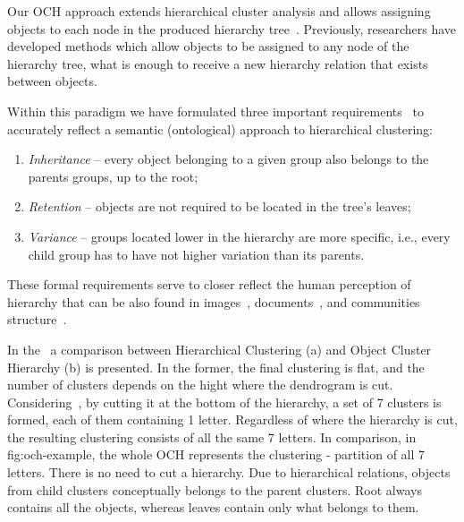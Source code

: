 \documentclass{article}
\begin{document}

    
Our OCH approach extends hierarchical cluster analysis and allows assigning objects to each node in the produced hierarchy tree~\cite{ghahramani2010tree,Spytkowski2012,Olech2016,2010_bayesian_rose_trees}. Previously, researchers have developed methods which allow objects to be assigned to any node of the hierarchy tree, what is enough to receive a new hierarchy relation that exists between objects.

    Within this paradigm we have formulated three important requirements~\cite{Spytkowski2012} to accurately reflect a semantic (ontological) approach to hierarchical clustering:
\begin{enumerate}
    \item {\textit{Inheritance} -- every object belonging to a given group also belongs to the parents groups, up to the root;}
    \item {\textit{Retention} -- objects are not required to be located in the tree’s leaves;}
    \item {\textit{Variance} -- groups located lower in the hierarchy are more specific, i.e., every child group has to have not higher variation than its parents.}
\end{enumerate}

These formal requirements serve to closer reflect the human perception of hierarchy that can be also found in images~\cite{ILSVRC15,ghahramani2010tree}, documents~\cite{ghahramani2010tree,2010_bayesian_rose_trees}, and communities structure~\cite{lancichinetti2009detecting, massaro2014hierarchical}.

In the~ a comparison between Hierarchical Clustering (a) and Object Cluster Hierarchy (b) is presented. In the former, the final clustering is flat, and the number of clusters depends on the hight where the dendrogram is cut. Considering~, by cutting it at the bottom of the hierarchy, a set of 7 clusters is formed, each of them containing 1 letter. Regardless of where the hierarchy is cut, the resulting clustering consists of all the same 7 letters. In comparison, in {fig:och-example}, the whole OCH represents the clustering - partition of all 7 letters. There is no need to cut a hierarchy. Due to hierarchical relations, objects from child clusters conceptually belongs to the parent clusters. Root always contains all the objects, whereas leaves contain only what belongs to them.
\end{document}
